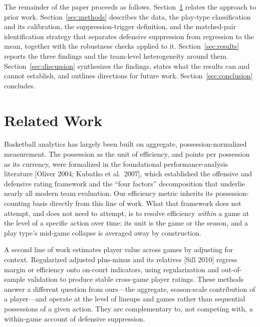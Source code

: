 \documentclass[11pt]{article}
\begin{document}
The remainder of the paper proceeds as follows. Section~\ref{sec:related} relates the approach to prior work. Section~\ref{sec:methods} describes the data, the play-type classification and its calibration, the suppression-trigger definition, and the matched-pair identification strategy that separates defensive suppression from regression to the mean, together with the robustness checks applied to it. Section~\ref{sec:results} reports the three findings and the team-level heterogeneity around them. Section~\ref{sec:discussion} synthesizes the findings, states what the results can and cannot establish, and outlines directions for future work. Section~\ref{sec:conclusion} concludes.

\section{Related Work}
\label{sec:related}

Basketball analytics has largely been built on aggregate, possession-normalized measurement. The possession as the unit of efficiency, and points per possession as its currency, were formalized in the foundational performance-analysis literature [Oliver 2004; Kubatko et al.\ 2007], which established the offensive and defensive rating framework and the ``four factors'' decomposition that underlie nearly all modern team evaluation. Our efficiency metric inherits its possession-counting basis directly from this line of work. What that framework does not attempt, and does not need to attempt, is to resolve efficiency \emph{within} a game at the level of a specific action over time: its unit is the game or the season, and a play type's mid-game collapse is averaged away by construction.

A second line of work estimates player value across games by adjusting for context. Regularized adjusted plus-minus and its relatives [Sill 2010] regress margin or efficiency onto on-court indicators, using regularization and out-of-sample validation to produce stable cross-game player ratings. These methods answer a different question from ours---the aggregate, season-scale contribution of a player---and operate at the level of lineups and games rather than sequential possessions of a given action. They are complementary to, not competing with, a within-game account of defensive suppression.
\end{document}
